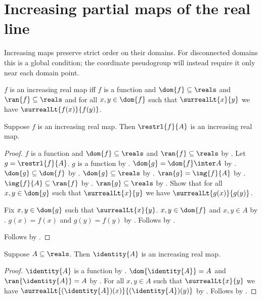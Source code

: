 \section{Increasing partial maps of the real line}




Increasing maps preserve strict order on their domains. For disconnected
domains this is a global condition; the coordinate pseudogroup will instead
require it only near each domain point.

\begin{definition}\label{increasing_real_map}
    $f$ is an increasing real map iff
        $f$ is a function and $\dom{f}\subseteq\reals$ and $\ran{f}\subseteq\reals$ and
        for all $x,y\in\dom{f}$ such that $\surrealLt{x}{y}$ we have
            $\surrealLt{f(x)}{f(y)}$.
\end{definition}

\begin{theorem}\label{increasing_real_map_restriction}
    Suppose $f$ is an increasing real map.
    Then $\restrl{f}{A}$ is an increasing real map.
\end{theorem}
\begin{proof}
    $f$ is a function and $\dom{f}\subseteq\reals$ and $\ran{f}\subseteq\reals$ by
        .
    Let $g=\restrl{f}{A}$.
    $g$ is a function by .
    $\dom{g}=\dom{f}\inter A$ by .
    $\dom{g}\subseteq\dom{f}$ by .
    $\dom{g}\subseteq\reals$ by .
    $\ran{g}=\img{f}{A}$ by .
    $\img{f}{A}\subseteq\ran{f}$ by .
    $\ran{g}\subseteq\reals$ by .
    Show that for all $x,y\in\dom{g}$ such that $\surrealLt{x}{y}$ we have
        $\surrealLt{g(x)}{g(y)}$.
    \begin{subproof}
        Fix $x,y\in\dom{g}$ such that $\surrealLt{x}{y}$.
        $x,y\in\dom{f}$ and $x,y\in A$ by .
        $g(x)=f(x)$ and $g(y)=f(y)$ by .
        Follows by .
    \end{subproof}
    Follows by .
\end{proof}

\begin{theorem}\label{identity_increasing_real_map}
    Suppose $A\subseteq\reals$.
    Then $\identity{A}$ is an increasing real map.
\end{theorem}
\begin{proof}
    $\identity{A}$ is a function by .
    $\dom{\identity{A}}=A$ and $\ran{\identity{A}}=A$ by .
    For all $x,y\in A$ such that $\surrealLt{x}{y}$ we have
        $\surrealLt{(\identity{A})(x)}{(\identity{A})(y)}$ by .
    Follows by .
\end{proof}

